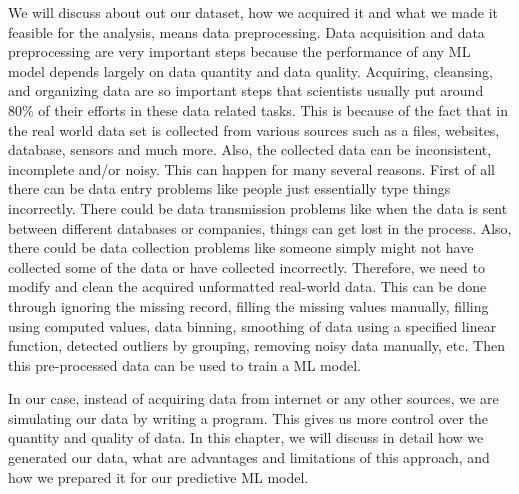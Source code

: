 \par
We will discuss about out our dataset, how we acquired it and what we made it feasible for the analysis, means data preprocessing. Data acquisition and data preprocessing are very important steps because the performance of any ML model depends largely on data quantity and data quality. Acquiring, cleansing, and organizing data are so important steps that scientists usually put around 80\% of their efforts in these data related tasks. This is because of the fact that in the real world data set is collected from various sources such as a files, websites, database, sensors and much more. Also, the collected data can be inconsistent, incomplete and/or noisy. This can happen for many several reasons. First of all there can be data entry problems like people just essentially type things incorrectly. There could be data transmission problems like when the data is sent between different databases or companies, things can get lost in the process. Also, there could be data collection problems like someone simply might not have collected some of the data or have collected incorrectly. Therefore, we need to modify and clean the acquired unformatted real-world data. This can be done through ignoring the missing record, filling the missing values manually, filling using computed values, data binning, smoothing of data using a specified linear function, detected outliers by grouping, removing noisy data manually, etc. Then this pre-processed data can be used to train a ML model.
\newline
\par
In our case, instead of acquiring data from internet or any other sources, we are simulating our data by writing a program. This gives us more control over the quantity and quality of data. In this chapter, we will discuss in detail how we generated our data, what are advantages and limitations of this approach, and how we prepared it for our predictive ML model.

